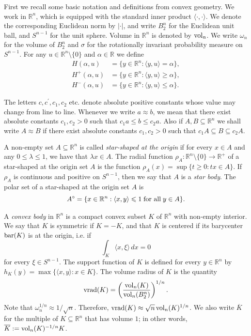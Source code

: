 \documentclass[11pt,leqno]{article}
\theoremstyle{definition}
\theoremstyle{remark}
\numberwithin{equation}{section}
\newcommand{\vol}{{\rm vol}}
\newcommand{\vrad}{{\rm vrad}}
\newcommand{\ls}{\leqslant}
\newcommand{\gr}{\geqslant}
\newcommand{\1}{\textbf{1}}
\begin{document}
First we recall some basic notation and definitions from convex geometry. We work in ${\mathbb R}^n$, which is equipped with the standard inner product  $\langle\cdot ,\cdot\rangle $. We denote the corresponding Euclidean norm by $|\cdot |$, and write $B_2^n$ for the Euclidean unit ball, and $S^{n-1}$ for the unit sphere. Volume in $\mathbb{R}^n$ is denoted by $\vol_n$. We write $\omega_n$ for the volume of $B_2^n$ and $\sigma $ for the rotationally invariant probability measure on $S^{n-1}$.  For any $u\in\mathbb{R}^n\setminus\{0\}$ and $\alpha\in\mathbb{R}$ we
define
\begin{align*}
H(\alpha,u) &=\{y\in\mathbb{R}^n:\langle y,u\rangle =\alpha\},\\
H^+(\alpha,u) &=\{y\in\mathbb{R}^n:\langle y,u\rangle \gr\alpha\},\\
H^-(\alpha,u) &=\{y\in\mathbb{R}^n:\langle y,u\rangle \ls\alpha\}.
\end{align*}

The letters $c,c^{\prime }, c_1, c_2$ etc. denote absolute positive constants whose value may change from line to line. Whenever we
write $a\approx b$, we mean that there exist absolute constants $c_1,c_2>0$ such that $c_1a\ls b\ls c_2a$.  Also if $A,B\subseteq
\mathbb R^n$ we shall write $A\approx B$ if there exist absolute constants $c_1, c_2>0$ such that $c_{1}A\subseteq B\subseteq c_{2}A$.

A non-empty set $A \subseteq \mathbb{R}^n$ is called {\it star-shaped at the origin} if for every $x \in A$ and any $0 \ls \lambda \ls 1$, we have that $\lambda x \in A$. The radial function $\rho_A:\mathbb R^n\setminus \{0\}\to \mathbb R^+$ of a star-shaped at the origin
set $A$ is the function $\rho_{A}(x)=\sup\{t\gr 0 : tx\in A\}$. If $\rho_A$ is continuous and positive on $S^{n-1}$, then we say that
$A$ is a {\it star body}. The polar set of a star-shaped at the origin set $A$ is
\begin{equation}A^\circ=\{x\in \mathbb R^n : \langle x,y\rangle \ls 1 \;\hbox{for all}\; y\in A\}.\end{equation}

A {\it convex body} in ${\mathbb R}^n$ is a compact convex subset $K$ of ${\mathbb R}^n$ with non-empty interior.
We say that $K$ is symmetric if $K=-K$, and that $K$ is centered if its barycenter ${\rm bar}(K)$ is at the origin, i.e. if
\begin{equation*}\int_K\langle x,\xi\rangle \, dx=0\end{equation*} for every $\xi\in S^{n-1}$.
The support function of $K$ is defined for every $y\in {\mathbb R}^n$ by
$h_K(y)=\max \{\langle x,y\rangle :x\in K\}$.
The volume radius of $K$ is the quantity
\begin{equation*}\vrad(K)=\left (\frac{\vol_n(K)}{\vol_n(B_2^n)}\right )^{1/n}.\end{equation*}
Note that $\omega_n^{1/n}\approx 1/\sqrt{n}$. Therefore, $\vrad(K)\approx \sqrt{n}\,\vol_n(K)^{1/n}$.
We also write $\overline{K}$ for the multiple of $K\subseteq \mathbb R^n$ that has volume $1$; in other words, $\overline{K}:=\vol_n(K)^{-1/n}K$.
\end{document}
